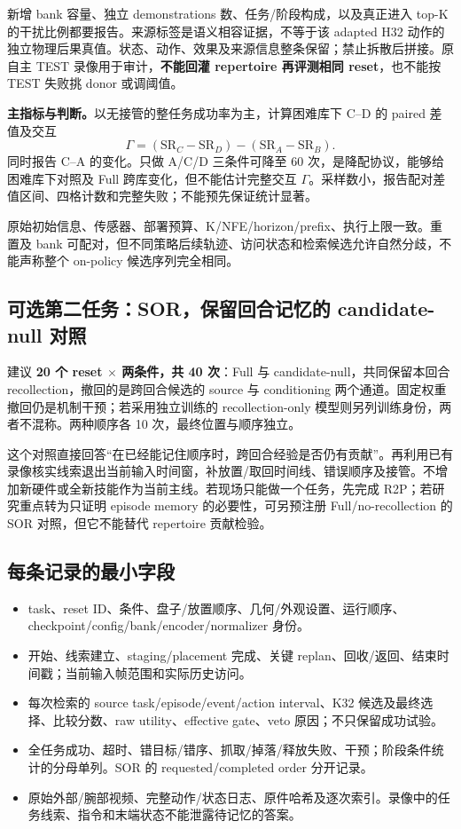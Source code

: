 新增 bank 容量、独立 demonstrations 数、任务/阶段构成，以及真正进入 top-K 的干扰比例都要报告。来源标签是语义相容证据，不等于该 adapted H32 动作的独立物理后果真值。状态、动作、效果及来源信息整条保留；禁止拆散后拼接。原自主 TEST 录像用于审计，\textbf{不能回灌 repertoire 再评测相同 reset}，也不能按 TEST 失败挑 donor 或调阈值。

\textbf{主指标与判断。}以无接管的整任务成功率为主，计算困难库下 C--D 的 paired 差值及交互
\[
\Gamma=(\mathrm{SR}_C-\mathrm{SR}_D)-(\mathrm{SR}_A-\mathrm{SR}_B).
\]
同时报告 C--A 的变化。只做 A/C/D 三条件可降至 60 次，是降配协议，能够给困难库下对照及 Full 跨库变化，但不能估计完整交互 $\Gamma$。采样数小，报告配对差值区间、四格计数和完整失败；不能预先保证统计显著。

原始初始信息、传感器、部署预算、K/NFE/horizon/prefix、执行上限一致。重置及 bank 可配对，但不同策略后续轨迹、访问状态和检索候选允许自然分歧，不能声称整个 on-policy 候选序列完全相同。

\subsection{可选第二任务：SOR，保留回合记忆的 candidate-null 对照}
建议 \textbf{20 个 reset $\times$ 两条件，共 40 次}：Full 与 candidate-null，共同保留本回合 recollection，撤回的是跨回合候选的 source 与 conditioning 两个通道。固定权重撤回仍是机制干预；若采用独立训练的 recollection-only 模型则另列训练身份，两者不混称。两种顺序各 10 次，最终位置与顺序独立。

这个对照直接回答“在已经能记住顺序时，跨回合经验是否仍有贡献”。再利用已有录像核实线索退出当前输入时间窗，补放置/取回时间线、错误顺序及接管。不增加新硬件或全新技能作为当前主线。若现场只能做一个任务，先完成 R2P；若研究重点转为只证明 episode memory 的必要性，可另预注册 Full/no-recollection 的 SOR 对照，但它不能替代 repertoire 贡献检验。

\subsection{每条记录的最小字段}
\begin{itemize}
\item task、reset ID、条件、盘子/放置顺序、几何/外观设置、运行顺序、checkpoint/config/bank/encoder/normalizer 身份。
\item 开始、线索建立、staging/placement 完成、关键 replan、回收/返回、结束时间戳；当前输入帧范围和实际历史访问。
\item 每次检索的 source task/episode/event/action interval、K32 候选及最终选择、比较分数、raw utility、effective gate、veto 原因；不只保留成功试验。
\item 全任务成功、超时、错目标/错序、抓取/掉落/释放失败、干预；阶段条件统计的分母单列。SOR 的 requested/completed order 分开记录。
\item 原始外部/腕部视频、完整动作/状态日志、原件哈希及逐次索引。录像中的任务线索、指令和末端状态不能泄露待记忆的答案。
\end{itemize}

